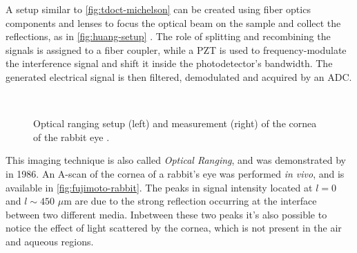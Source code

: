 A setup similar to \autoref{fig:tdoct-michelson} can be created using fiber optics components and lenses to focus the optical beam on the sample and collect the reflections, as in \autoref{fig:huang-setup} \cite{Huang1991}. The role of splitting and recombining the signals is assigned to a fiber coupler, while a \ac{PZT} is used to frequency-modulate the interference signal and shift it inside the photodetector's bandwidth. The generated electrical signal is then filtered, demodulated and acquired by an \ac{ADC}.



\begin{figure}[hbt]
	\myfloatalign
	 \quad
	\\
	\caption{ Optical ranging setup (left) and measurement (right) of the cornea of the rabbit eye \cite{Fujimoto1986}. }\label{fig:fujimoto}
\end{figure}

This imaging technique is also called \emph{Optical Ranging}, and was demonstrated by \citeauthor{Fujimoto1986}\cite{Fujimoto1986} in 1986. An A-scan of the cornea of a rabbit's eye was performed \emph{in vivo}, and is available in \autoref{fig:fujimoto-rabbit}. The peaks in signal intensity located at $l = 0$ and $l \sim 450$ $\mu$m are due to the strong reflection occurring at the interface between two different media. Inbetween these two peaks it's also possible to notice the effect of light scattered by the cornea, which is not present in the air and aqueous regions. 


